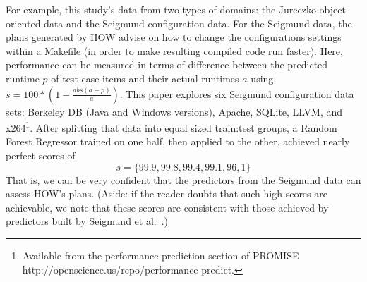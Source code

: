 \documentclass[conference]{IEEEtran}
\begin{document}
For example, this study's data from two types of domains: the Jureczko   object-oriented data  
and the Seigmund configuration data. 
For the Seigmund data, the plans generated by HOW advise on how  to change the   configurations settings within a Makefile
(in order to make resulting compiled
code  run faster). Here, performance can be measured in terms of  difference
between the predicted runtime $p$ of test case items and their actual runtimes $a$
using  $s= 100*(1- \frac{abs(a - p)}{a})$.
This paper  explores    six Seigmund configuration data sets:  Berkeley DB (Java and Windows versions), Apache, SQLite, LLVM, and
  x264\footnote{Available from the performance prediction section of PROMISE
  http://openscience.us/repo/performance-predict.}. 
  After splitting that data into equal sized train:test groups, a Random Forest
  Regressor trained on one half, then applied to the other, achieved nearly perfect scores of
\[s=\{99.9, 99.8, 99.4, 99.1, 96,1\}\]
That is, we can be very confident that the predictors from the Seigmund data can assess
HOW's plans.
(Aside: if the reader doubts that such high scores are achievable, we note that these scores are 
consistent with those achieved by predictors built by Seigmund et al.~\cite{sven12}.)
\end{document}
